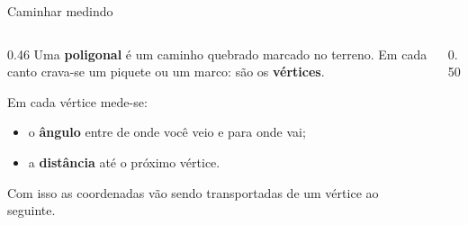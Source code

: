 \documentclass[aspectratio=169,11pt]{beamer}
\newcommand{\bnum}[1]{\textbf{\textcolor{mTeal}{#1}}}
\newcommand{\ang}[1]{\textcolor{corAng}{\textbf{#1}}}
\begin{document}
\begin{frame}{Caminhar medindo}
  \begin{columns}[T]
    \begin{column}{0.46\textwidth}
      Uma \bnum{poligonal} é um caminho quebrado marcado no terreno. Em cada canto crava-se
      um piquete ou um marco: são os \bnum{vértices}.
      \medskip

      Em cada vértice mede-se:
      \begin{itemize}
        \item o \ang{ângulo} entre de onde você veio e para onde vai;
        \item a \textcolor{corApoio}{\textbf{distância}} até o próximo vértice.
      \end{itemize}
      \medskip
      Com isso as coordenadas vão sendo \alert{transportadas} de um vértice ao seguinte.
    \end{column}
    \begin{column}{0.50\textwidth}
      \centering
    \end{column}
  \end{columns}
\end{frame}
\end{document}
